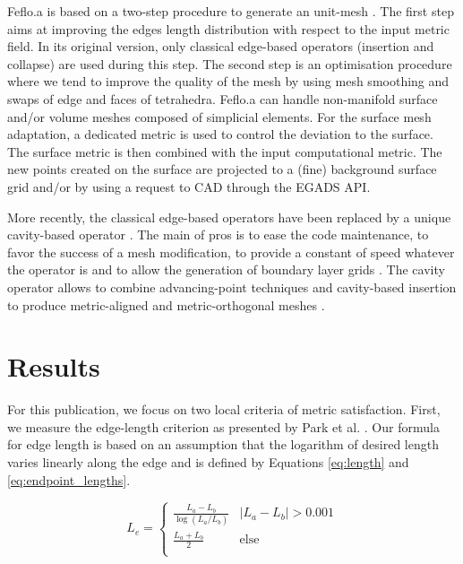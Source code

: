 \documentclass[3p,times,procedia,number]{elsarticle}
\begin{document}
Feflo.a is based on a two-step procedure to generate an unit-mesh \cite{loseille-lohner-adapt-boom, loseille-handbook}. The first step aims at improving the edges length distribution
with respect to the input metric field. In its original version, only classical edge-based operators (insertion and collapse) are used during this step.
The second step is an optimisation procedure where we tend to improve the quality of the mesh by using mesh smoothing
and swaps of edge and faces of tetrahedra. Feflo.a can handle non-manifold surface and/or volume meshes composed of simplicial elements. For the surface mesh
adaptation, a dedicated metric is used to control the deviation to the surface. The surface metric is then combined with the input computational metric.
The new points created on the surface are projected to a  (fine) background surface grid and/or by using  a request to CAD through the EGADS API.

More recently, the classical edge-based operators have been replaced by a unique cavity-based operator \cite{loseille-menier-imr22-cavity,loseille-menier-alauzet-para-adapt}. The main of pros is to ease the code maintenance,
to favor the success of a mesh modification, to provide a constant of speed whatever the operator is and to allow the generation
of boundary layer grids \cite{loseille-lohner-imr21-robust-bl-gen}.  The cavity operator allows to combine advancing-point techniques
and cavity-based insertion to produce  metric-aligned and metric-orthogonal meshes \cite{loseille-imr-metric-ortho-aniso-gen}.

\section{Results}

For this publication, we focus on two local criteria of metric
satisfaction.
First, we measure the edge-length criterion as presented
by Park et al. \cite{park-loseille-krakos-michal-adapt-decomposition}.
Our formula for edge length is based on an assumption
that the logarithm of desired length varies linearly along the
edge \cite{alauzet-fead-2010-size-gradation-aniso} and is defined
by Equations \ref{eq:length} and \ref{eq:endpoint_lengths}.

\begin{equation}
\label{eq:length}
L_e = \begin{cases}
\frac{L_a - L_b}{\log(L_a / L_b)} & |L_a - L_b| > 0.001 \\
\frac{L_a + L_b}{2} & \text{else} \\
\end{cases}
\end{equation}
\end{document}
